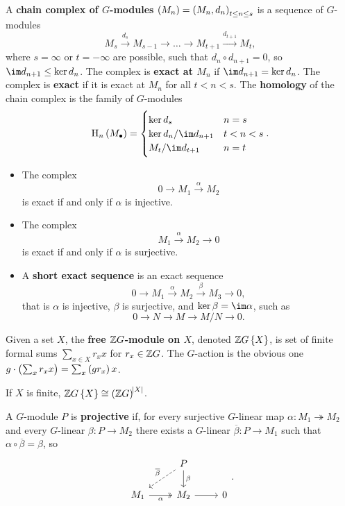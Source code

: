 \begin{definition}
A \textbf{chain complex of $ G $-modules} $ \br{M_n} = \br{M_n, d_n}_{t \le n \le s} $ is a sequence of $ G $-modules
$$ M_s \xrightarrow{d_s} M_{s - 1} \to \dots \to M_{t + 1} \xrightarrow{d_{t + 1}} M_t, $$
where $ s = \infty $ or $ t = -\infty $ are possible, such that $ d_n \circ d_{n + 1} = 0 $, so $ \im d_{n + 1} \le \ker d_n $. The complex is \textbf{exact at $ M_n $} if $ \im d_{n + 1} = \ker d_n $. The complex is \textbf{exact} if it is exact at $ M_n $ for all $ t < n < s $. The \textbf{homology} of the chain complex is the family of $ G $-modules
$$ \H_n\br{M_\bullet} =
\begin{cases}
\ker d_s & n = s \\
\ker d_n / \im d_{n + 1} & t < n < s \\
M_t / \im d_{t + 1} & n = t
\end{cases}.
$$
\end{definition}

\begin{example}
\hfill
\begin{itemize}
\item The complex
$$ 0 \to M_1 \xrightarrow{\alpha} M_2 $$
is exact if and only if $ \alpha $ is injective.
\item The complex
$$ M_1 \xrightarrow{\alpha} M_2 \to 0 $$
is exact if and only if $ \alpha $ is surjective.
\item A \textbf{short exact sequence} is an exact sequence
$$ 0 \to M_1 \xrightarrow{\alpha} M_2 \xrightarrow{\beta} M_3 \to 0, $$
that is $ \alpha $ is injective, $ \beta $ is surjective, and $ \ker \beta = \im \alpha $, such as
$$ 0 \to N \to M \to M / N \to 0. $$
\end{itemize}
\end{example}

\begin{definition}
Given a set $ X $, the \textbf{free $ \mathbb{Z} G $-module on $ X $}, denoted $ \ZZ G\cbr{X} $, is set of finite formal sums $ \sum_{x \in X} r_xx $ for $ r_x \in \mathbb{Z} G $. The $ G $-action is the obvious one $ g \cdot \br{\sum_x r_xx} = \sum_x \br{gr_x}x $.
\end{definition}

If $ X $ is finite, $ \ZZ G\cbr{X} \cong \br{\ZZ G}^{\abs{X}} $.

\begin{definition}
A $ G $-module $ P $ is \textbf{projective} if, for every surjective $ G $-linear map $ \alpha : M_1 \twoheadrightarrow M_2 $ and every $ G $-linear $ \beta : P \to M_2 $ there exists a $ G $-linear $ \overline{\beta} : P \to M_1 $ such that $ \alpha \circ \overline{\beta} = \beta $, so
$$
\begin{tikzcd}
& P \arrow[dashed]{dl}[swap]{\overline{\beta}} \arrow{d}{\beta} & \\
M_1 \arrow[twoheadrightarrow]{r}[swap]{\alpha} & M_2 \arrow{r} & 0
\end{tikzcd}.
$$
\end{definition}

